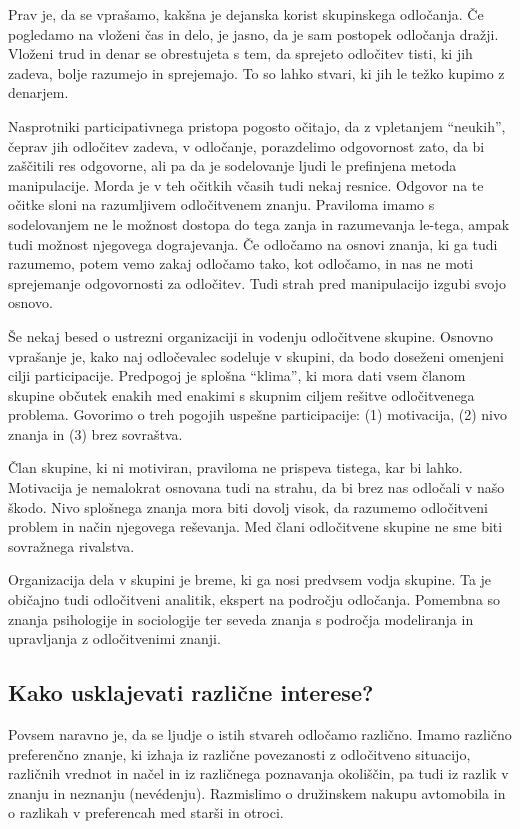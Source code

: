 Prav je, da se vprašamo, kakšna je dejanska korist skupinskega odločanja. Če pogledamo na vloženi čas in delo, je jasno, da je sam postopek odločanja dražji. Vloženi trud in denar se obrestujeta s tem, da sprejeto odločitev tisti, ki jih zadeva, bolje razumejo in sprejemajo. To so lahko stvari, ki jih le težko kupimo z denarjem.

Nasprotniki participativnega pristopa pogosto očitajo, da z vpletanjem ``neukih'', čeprav jih odločitev zadeva, v odločanje, porazdelimo odgovornost zato, da bi zaščitili res odgovorne, ali pa da je sodelovanje ljudi le prefinjena metoda manipulacije. Morda je v teh očitkih včasih tudi nekaj resnice. Odgovor na te očitke sloni na razumljivem odločitvenem znanju. Praviloma imamo s sodelovanjem ne le možnost dostopa do tega zanja in razumevanja le-tega, ampak tudi možnost njegovega dograjevanja. Če odločamo na osnovi znanja, ki ga tudi razumemo, potem vemo zakaj odločamo tako, kot odločamo, in nas ne moti sprejemanje odgovornosti za odločitev. Tudi strah pred manipulacijo izgubi svojo osnovo.

Še nekaj besed o ustrezni organizaciji in vodenju odločitvene skupine. Osnovno vprašanje je, kako naj odločevalec sodeluje v skupini, da bodo doseženi omenjeni cilji participacije. Predpogoj je splošna ``klima'', ki mora dati vsem članom skupine občutek enakih med enakimi s skupnim ciljem rešitve odločitvenega problema. Govorimo o treh pogojih uspešne participacije: (1) motivacija, (2) nivo znanja in (3) brez sovraštva. 

Član skupine, ki ni motiviran, praviloma ne prispeva tistega, kar bi lahko. Motivacija je nemalokrat osnovana tudi  na strahu, da bi brez nas odločali v našo škodo. Nivo splošnega znanja mora biti dovolj visok, da razumemo odločitveni problem in način njegovega reševanja. Med člani odločitvene skupine ne sme biti sovražnega rivalstva.

Organizacija dela v skupini je breme, ki ga nosi predvsem vodja skupine. Ta je običajno tudi odločitveni analitik, ekspert na področju odločanja. Pomembna so znanja psihologije in sociologije ter seveda znanja s področja modeliranja in upravljanja z odločitvenimi znanji.

\subsection{Kako usklajevati različne interese?}

Povsem naravno je, da se ljudje o istih stvareh odločamo različno. Imamo različno preferenčno znanje, ki izhaja iz različne povezanosti z odločitveno situacijo, različnih vrednot in načel in iz različnega poznavanja okoliščin, pa tudi iz razlik v znanju in neznanju (nevédenju). Razmislimo o družinskem nakupu avtomobila in o razlikah v preferencah med starši in otroci.


